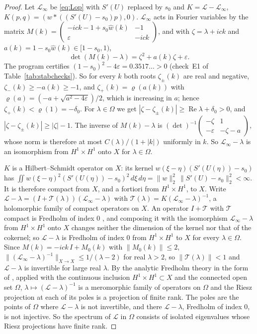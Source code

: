 \documentclass[11pt]{article}
\theoremstyle{definition}
\newcommand{\eps}{\varepsilon}
\newcommand{\re}{\operatorname{Re}}
\newcommand{\Lop}{\mathcal{L}}
\newcommand{\dz}{\delta_0}
\begin{document}
\begin{proof}
Let $\Lop_\infty$ be \eqref{eq:Lop} with $S'(U)$ replaced by $s_0$ and $K = \Lop - \Lop_\infty$, $K(p, q) = (w * ((S'(U) - s_0)p), 0)$. $\Lop_\infty$ acts in Fourier variables by the matrix $M(k) = \begin{pmatrix} -ick - 1 + s_0\hat w(k) & -1 \\ \eps & -ick \end{pmatrix}$, and with $\zeta = \lambda + ick$ and $a(k) = 1 - s_0\hat w(k) \in [1 - s_0, 1)$,
\[
  \det(M(k) - \lambda) = \zeta^2 + a(k)\zeta + \eps .
\]
The program certifies $(1 - s_0)^2 - 4\eps = 0.3517\ldots > 0$ (check~E1 of Table~\ref{tab:stabchecks}). So for every $k$ both roots $\zeta_\pm(k)$ are real and negative, $\zeta_-(k) \ge -a(k) \ge -1$, and $\zeta_+(k) = \varrho(a(k))$ with $\varrho(a) = (-a + \sqrt{a^2 - 4\eps})/2$, which is increasing in $a$; hence $\zeta_+(k) < \varrho(1) = -\dz$. For $\lambda \in \Omega$ we get $|\zeta - \zeta_\pm(k)| \ge \re\lambda + \dz > 0$, and $|\zeta - \zeta_\pm(k)| \ge |\zeta| - 1$. The inverse of $M(k) - \lambda$ is $(\det)^{-1}\begin{pmatrix} -\zeta & 1 \\ -\eps & -\zeta - a \end{pmatrix}$, whose norm is therefore at most $C(\lambda)/(1 + |k|)$ uniformly in $k$. So $\Lop_\infty - \lambda$ is an isomorphism from $H^1 \times H^1$ onto $X$ for $\lambda \in \Omega$.

$K$ is a Hilbert--Schmidt operator on $X$: its kernel $w(\xi - \eta)(S'(U(\eta)) - s_0)$ has $\iint w(\xi - \eta)^2(S'(U(\eta)) - s_0)^2\, d\xi\, d\eta = \|w\|_2^2\,\|S'(U) - s_0\|_2^2 < \infty$. It is therefore compact from $X$, and a fortiori from $H^1 \times H^1$, to $X$. Write $\Lop - \lambda = (I + \mathcal{T}(\lambda))(\Lop_\infty - \lambda)$ with $\mathcal{T}(\lambda) = K(\Lop_\infty - \lambda)^{-1}$, a holomorphic family of compact operators on $X$. An operator $I + \mathcal{T}$ with $\mathcal{T}$ compact is Fredholm of index $0$ \cite[(C.2.1), (C.2.2) and Theorem~C.5]{dz2019}, and composing it with the isomorphism $\Lop_\infty - \lambda$ from $H^1 \times H^1$ onto $X$ changes neither the dimension of the kernel nor that of the cokernel; so $\Lop - \lambda$ is Fredholm of index $0$ from $H^1 \times H^1$ to $X$ for every $\lambda \in \Omega$. Since $M(k) = -ick\, I + M_0(k)$ with $\|M_0(k)\| \le 2$, $\|(\Lop_\infty - \lambda)^{-1}\|_{X \to X} \le 1/(\lambda - 2)$ for real $\lambda > 2$, so $\|\mathcal{T}(\lambda)\| < 1$ and $\Lop - \lambda$ is invertible for large real $\lambda$. By the analytic Fredholm theory in the form of \cite[Theorem~C.9]{dz2019}, applied with the continuous inclusion $H^1 \times H^1 \subset X$ and the connected open set $\Omega$, $\lambda \mapsto (\Lop - \lambda)^{-1}$ is a meromorphic family of operators on $\Omega$ and the Riesz projection at each of its poles is a projection of finite rank. The poles are the points of $\Omega$ where $\Lop - \lambda$ is not invertible, and there $\Lop - \lambda$, Fredholm of index $0$, is not injective. So the spectrum of $\Lop$ in $\Omega$ consists of isolated eigenvalues whose Riesz projections have finite rank.
\end{proof}
\end{document}
